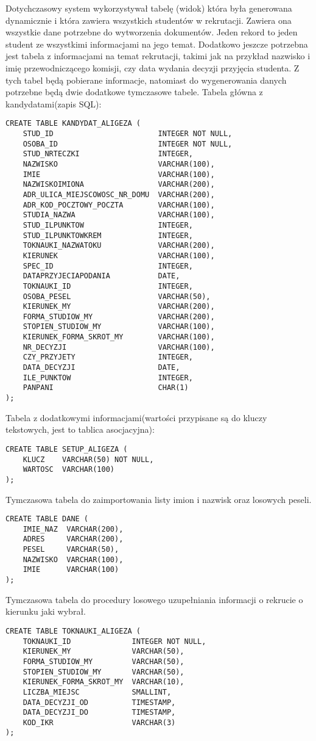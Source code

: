 Dotychczasowy system wykorzystywał tabelę (widok) która była generowana dynamicznie i która zawiera wszystkich studentów w rekrutacji. Zawiera ona wszystkie dane potrzebne do wytworzenia dokumentów. Jeden rekord to jeden student ze wszystkimi informacjami na jego temat. Dodatkowo jeszcze potrzebna jest tabela z informacjami na temat rekrutacji, takimi jak na przykład nazwisko i imię przewodniczącego komisji, czy data wydania decyzji przyjęcia studenta. Z tych tabel będą pobierane informacje, natomiast do wygenerowania danych potrzebne będą dwie dodatkowe tymczasowe tabele.
Tabela główna z kandydatami(zapis SQL):
\begin{lstlisting}
CREATE TABLE KANDYDAT_ALIGEZA (
    STUD_ID                        INTEGER NOT NULL,
    OSOBA_ID                       INTEGER NOT NULL,
    STUD_NRTECZKI                  INTEGER,
    NAZWISKO                       VARCHAR(100),
    IMIE                           VARCHAR(100),
    NAZWISKOIMIONA                 VARCHAR(200),
    ADR_ULICA_MIEJSCOWOSC_NR_DOMU  VARCHAR(200),
    ADR_KOD_POCZTOWY_POCZTA        VARCHAR(100),
    STUDIA_NAZWA                   VARCHAR(100),
    STUD_ILPUNKTOW                 INTEGER,
    STUD_ILPUNKTOWKREM             INTEGER,
    TOKNAUKI_NAZWATOKU             VARCHAR(200),
    KIERUNEK                       VARCHAR(100),
    SPEC_ID                        INTEGER,
    DATAPRZYJECIAPODANIA           DATE,
    TOKNAUKI_ID                    INTEGER,
    OSOBA_PESEL                    VARCHAR(50),
    KIERUNEK_MY                    VARCHAR(200),
    FORMA_STUDIOW_MY               VARCHAR(200),
    STOPIEN_STUDIOW_MY             VARCHAR(100),
    KIERUNEK_FORMA_SKROT_MY        VARCHAR(100),
    NR_DECYZJI                     VARCHAR(100),
    CZY_PRZYJETY                   INTEGER,
    DATA_DECYZJI                   DATE,
    ILE_PUNKTOW                    INTEGER,
    PANPANI                        CHAR(1)
);
\end{lstlisting}
Tabela z dodatkowymi informacjami(wartości przypisane są do kluczy tekstowych, jest to tablica asocjacyjna):
\begin{lstlisting}
CREATE TABLE SETUP_ALIGEZA (
    KLUCZ    VARCHAR(50) NOT NULL,
    WARTOSC  VARCHAR(100)
);
\end{lstlisting}
Tymczasowa tabela do zaimportowania listy imion i nazwisk oraz losowych peseli.
\begin{lstlisting}
CREATE TABLE DANE (
    IMIE_NAZ  VARCHAR(200),
    ADRES     VARCHAR(200),
    PESEL     VARCHAR(50),
    NAZWISKO  VARCHAR(100),
    IMIE      VARCHAR(100)
);
\end{lstlisting}
Tymczasowa tabela do procedury losowego uzupełniania informacji o rekrucie o kierunku jaki wybrał.
\begin{lstlisting}
CREATE TABLE TOKNAUKI_ALIGEZA (
    TOKNAUKI_ID              INTEGER NOT NULL,
    KIERUNEK_MY              VARCHAR(50),
    FORMA_STUDIOW_MY         VARCHAR(50),
    STOPIEN_STUDIOW_MY       VARCHAR(50),
    KIERUNEK_FORMA_SKROT_MY  VARCHAR(10),
    LICZBA_MIEJSC            SMALLINT,
    DATA_DECYZJI_OD          TIMESTAMP,
    DATA_DECYZJI_DO          TIMESTAMP,
    KOD_IKR                  VARCHAR(3)
);
\end{lstlisting}
